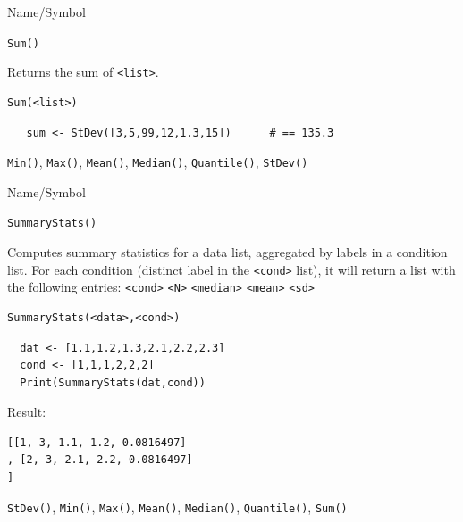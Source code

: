 \begin{desc}{Name/Symbol}
\item[Name/Symbol]  	\verb+Sum()+ 

\item[Description]  Returns the sum  of \verb+<list>+.

\item[Usage]       	
\begin{verbatim}
Sum(<list>)        
\end{verbatim}

\item[Example]	
\begin{verbatim}
   sum <- StDev([3,5,99,12,1.3,15])      # == 135.3
\end{verbatim}

\item[See Also]     	\verb+Min()+, \verb+Max()+, \verb+Mean()+, \verb+Median()+, \verb+Quantile()+, \verb+StDev()+
\end{desc}





\begin{desc}{Name/Symbol}
\item[Name/Symbol]  	\verb+SummaryStats()+

\item[Description] Computes summary statistics for a data list,
  aggregated by labels in a condition list.
For each condition (distinct label in the \verb+<cond>+ list), it will 
return a list with the following entries:
\verb+<cond>+ \verb+<N>+ \verb+<median>+ \verb+<mean>+ \verb+<sd>+

\item[Usage]		
\begin{verbatim}
SummaryStats(<data>,<cond>)        
\end{verbatim}

\item[Example]	
\begin{verbatim}
  dat <- [1.1,1.2,1.3,2.1,2.2,2.3]
  cond <- [1,1,1,2,2,2]
  Print(SummaryStats(dat,cond))
\end{verbatim}
Result:
\begin{verbatim}
[[1, 3, 1.1, 1.2, 0.0816497]
, [2, 3, 2.1, 2.2, 0.0816497]
]
\end{verbatim}
\item[See Also]	
  	\verb+StDev()+, \verb+Min()+, \verb+Max()+, \verb+Mean()+, \verb+Median()+, \verb+Quantile()+, \verb+Sum()+
\end{desc}




